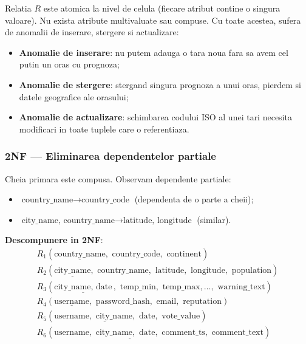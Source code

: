 \documentclass[12pt,a4paper]{article}
\begin{document}
Relatia $R$ este atomica la nivel de celula (fiecare atribut contine o singura valoare). Nu exista atribute multivaluate sau compuse. Cu toate acestea, sufera de anomalii de inserare, stergere si actualizare:
\begin{itemize}[noitemsep]
    \item \textbf{Anomalie de inserare}: nu putem adauga o tara noua fara sa avem cel putin un oras cu prognoza;
    \item \textbf{Anomalie de stergere}: stergand singura prognoza a unui oras, pierdem si datele geografice ale orasului;
    \item \textbf{Anomalie de actualizare}: schimbarea codului ISO al unei tari necesita modificari in toate tuplele care o referentiaza.
\end{itemize}

\subsubsection{2NF --- Eliminarea dependentelor partiale}

Cheia primara este compusa. Observam dependente partiale:
\begin{itemize}
    \item $\text{country\_name} \rightarrow \text{country\_code}$ (dependenta de o parte a cheii);
    \item $\text{city\_name, country\_name} \rightarrow \text{latitude, longitude}$ (similar).
\end{itemize}

\textbf{Descompunere in 2NF}:
\begin{align*}
R_1(\underline{\text{country\_name}}, \text{ country\_code}, \text{ continent}) \\
R_2(\underline{\text{city\_name}}, \text{ country\_name}, \text{ latitude}, \text{ longitude}, \text{ population}) \\
R_3(\underline{\text{city\_name}, \text{ date}}, \text{ temp\_min}, \text{ temp\_max}, \dots, \text{ warning\_text}) \\
R_4(\underline{\text{username}}, \text{ password\_hash}, \text{ email}, \text{ reputation}) \\
R_5(\underline{\text{username}, \text{ city\_name}, \text{ date}}, \text{ vote\_value}) \\
R_6(\underline{\text{username}, \text{ city\_name}, \text{ date}, \text{ comment\_ts}}, \text{ comment\_text})
\end{align*}
\end{document}
